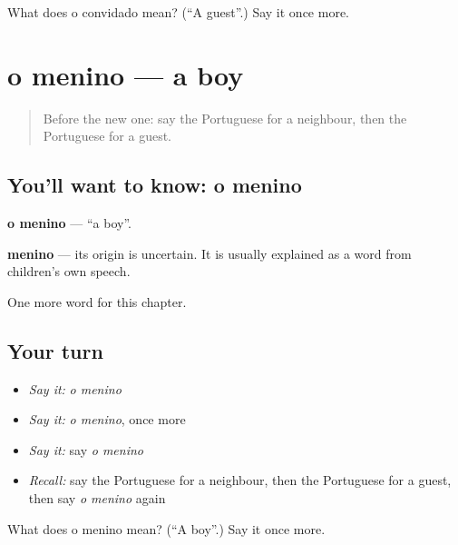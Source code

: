 \begin{tcolorbox}[breakable,colback=teal!4,colframe=teal!35!black,title={Before you move on}]
What does o convidado mean? (\textquotedblleft{}A guest\textquotedblright{}.) Say it once more.
\end{tcolorbox}
\section[o menino]{o menino — a boy}

\label{lesson:PT-C39-menino}



\begin{quote}
Before the new one: say the Portuguese for a neighbour, then the Portuguese for a guest.
\end{quote}

\subsection*{You'll want to know: o menino}
\textbf{o menino} — \textquotedblleft{}a boy\textquotedblright{}.

\begin{cousinweb}
\textbf{menino} — its origin is uncertain. It is usually explained as a word from children's own speech.
\end{cousinweb}

\begin{grammarlens}[title={What you've built}]
One more word for this chapter.
\end{grammarlens}

\subsection*{Your turn}
\begin{itemize}
\raggedright
  \item \emph{Say it:} \emph{o menino}
  \item \emph{Say it:} \emph{o menino}, once more
  \item \emph{Say it:} say \emph{o menino}
  \item \emph{Recall:} say the Portuguese for a neighbour, then the Portuguese for a guest, then say \emph{o menino} again
\end{itemize}

\begin{tcolorbox}[breakable,colback=teal!4,colframe=teal!35!black,title={Before you move on}]
What does o menino mean? (\textquotedblleft{}A boy\textquotedblright{}.) Say it once more.
\end{tcolorbox}
